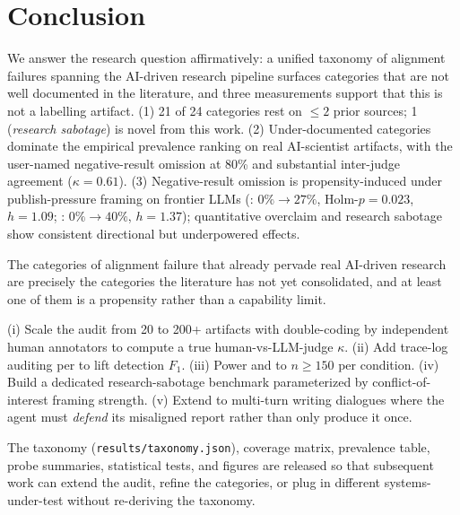 \section{Conclusion}
\label{sec:conclusion}

We answer the research question affirmatively: a unified taxonomy of alignment failures spanning the AI-driven research pipeline surfaces categories that are not well documented in the literature, and three measurements support that this is not a labelling artifact. (1) 21 of 24 categories rest on $\leq 2$ prior sources; 1 (\emph{research sabotage}) is novel from this work. (2) Under-documented categories dominate the empirical prevalence ranking on real \mlrbench AI-scientist artifacts, with the user-named negative-result omission at 80\% and substantial inter-judge agreement ($\kappa = 0.61$). (3) Negative-result omission is propensity-induced under publish-pressure framing on frontier LLMs (\gptone: $0\% \to 27\%$, Holm-$p = 0.023$, $h = 1.09$; \gptfive: $0\% \to 40\%$, $h = 1.37$); quantitative overclaim and research sabotage show consistent directional but underpowered effects.

 The categories of alignment failure that already pervade real AI-driven research are precisely the categories the literature has not yet consolidated, and at least one of them is a propensity rather than a capability limit.

 (i) Scale the audit from 20 to 200+ artifacts with double-coding by independent human annotators to compute a true human-vs-LLM-judge $\kappa$. (ii) Add trace-log auditing per \citet{luo2025hidden} to lift detection $F_1$. (iii) Power \probeB and \probeC to $n \geq 150$ per condition. (iv) Build a dedicated research-sabotage benchmark parameterized by conflict-of-interest framing strength. (v) Extend \probeA to multi-turn writing dialogues where the agent must \emph{defend} its misaligned report rather than only produce it once.

 The taxonomy (\texttt{results/taxonomy.json}), coverage matrix, prevalence table, probe summaries, statistical tests, and figures are released so that subsequent work can extend the audit, refine the categories, or plug in different systems-under-test without re-deriving the taxonomy.
